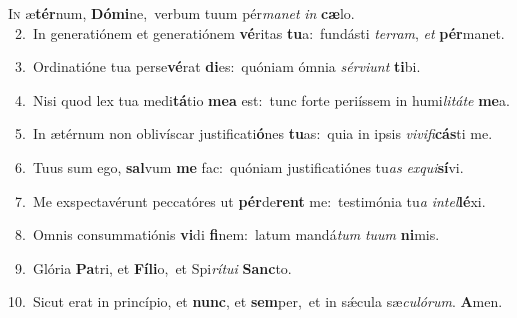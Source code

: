 \lettrine{\initial\textcolor{\initialcolor}{I}}{n} æ\-\textbf{tér}\-num, \textbf{Dó}\-\textbf{mi}ne,~\star verbum tuum pér\-\textit{ma}\-\textit{net} \textit{in} \textbf{cæ}\-lo.\\
{\numbfont\textcolor{\numbcolor}{~2.}}~In generatiónem et generatiónem \textbf{vé}\-ritas \textbf{tu}\-a:~\star fundásti \textit{ter}\-\textit{ram}, \textit{et} \textbf{pér}\-manet.\par
{\numbfont\textcolor{\numbcolor}{~3.}}~Ordinatióne tua perse\-\textbf{vé}\-rat \textbf{di}\-es:~\star quóniam ómnia \textit{sér}\-\textit{vi}\textit{unt} \textbf{ti}\-bi.\par
{\numbfont\textcolor{\numbcolor}{~4.}}~Nisi quod lex tua medi\-\textbf{tá}\-tio \textbf{me}\-\textbf{a} est:~\star tunc forte periíssem in humi\-\textit{li}\-\textit{tá}\textit{te} \textbf{me}\-a.\par
{\numbfont\textcolor{\numbcolor}{~5.}}~In ætérnum non oblivíscar justificati\-\textbf{ó}\-nes \textbf{tu}\-as:~\star quia in ipsis \textit{vi}\-\textit{vi}\textit{fi}\textbf{cás}ti me.\par
{\numbfont\textcolor{\numbcolor}{~6.}}~Tuus sum ego, \textbf{sal}\-vum \textbf{me} fac:~\star quóniam justificatiónes tu\textit{as} \textit{ex}\-\textit{qui}\textbf{sí}vi.\par
{\numbfont\textcolor{\numbcolor}{~7.}}~Me exspectavérunt peccatóres ut \textbf{pér}\-de\textbf{rent} me:~\star testimónia tu\textit{a} \textit{in}\-\textit{tel}\textbf{lé}xi.\par
{\numbfont\textcolor{\numbcolor}{~8.}}~Omnis consummatiónis \textbf{vi}\-di \textbf{fi}\-nem:~\star latum mandá\textit{tum} \textit{tu}\-\textit{um} \textbf{ni}\-mis.\par
{\numbfont\textcolor{\numbcolor}{~9.}}~Glória \textbf{Pa}\-tri, et \textbf{Fí}\-\textbf{li}o,~\star et Spi\-\textit{rí}\-\textit{tu}\textit{i} \textbf{Sanc}\-to.\par
{\numbfont\textcolor{\numbcolor}{10.}}~Sicut erat in princípio, et \textbf{nunc}\-, et \textbf{sem}\-per,~\star et in sǽcula sæ\-\textit{cu}\-\textit{ló}\textit{rum}. \textbf{A}\-men.\par
